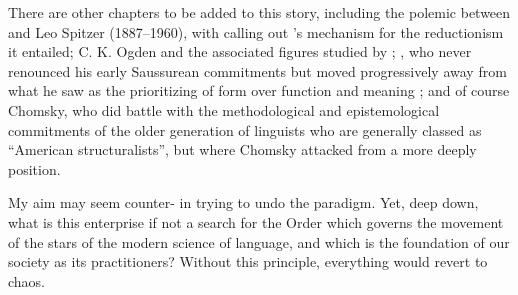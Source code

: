 \documentclass[output=paper]{langscibook}
\begin{document}
There are other chapters to be added to this story, including the polemic between {\Bloomfield} and Leo Spitzer (1887--1960), with \citet{Spitzer1944} calling out {\Bloomfield}'s mechanism for the reductionism it entailed; C. K. Ogden and the associated figures studied by \citet{McElvenny2018}; {\Hjelmslev}, who never renounced his early Saussurean commitments but moved progressively away from what he saw as the prioritizing of form over function and meaning \citep{Joseph2018hj}; and of course Chomsky, who did battle with the methodological and epistemological commitments of the older generation of linguists who are generally classed as ``American structuralists'', but where Chomsky attacked from a more deeply  position.

My aim may seem counter- in trying to undo the paradigm. Yet, deep down, what is this enterprise if not a search for the Order which governs the movement of the stars of the modern science of language, and which is the foundation of our society as its practitioners? Without this principle, everything would revert to chaos.

\sloppy
\printbibliography[heading=subbibliography,notkeyword=this]
\end{document}
